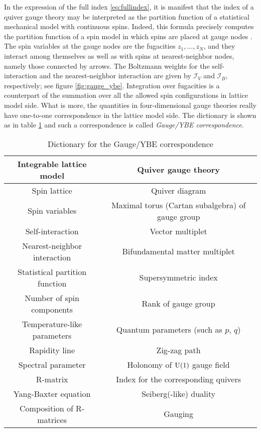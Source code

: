In the expression of the full index \eqref{eq:fullindex},
it is manifest that the index of a quiver gauge theory may be interpreted
as the partition function of a statistical mechanical model with continuous
spins. Indeed, this formula precisely computes the partition function
of a spin model in which spins are placed at gauge nodes \cite{Yamazaki:2012cp,Yagi:2015lha}.
The spin variables at the gauge nodes are the fugacities $z_{1},\ldots,z_{N}$, and
they interact among themselves as well as with spins at nearest-neighbor
nodes, namely those connected by arrows. The Boltzmann weights for
the self-interaction and the nearest-neighbor interaction are given by $\mathcal{I}_{V}$
and $\mathcal{I}_{B}$, respectively; see figure \ref{fig:gauge_ybe}.
Integration over fugacities is a counterpart of the summation over all the
allowed spin configurations in lattice model side.
What is more, the quantities in four-dimensional gauge theories really have one-to-one
correspondence in the lattice model side. The dictionary is shown as
in table \ref{tab:gauge_ybe} and such a correspondence is called \emph{Gauge/YBE correspondence}.


\begin{table}
\caption{Dictionary for the Gauge/YBE correspondence}
\vspace{0.2cm}
  \centering
    \begin{tabular}{c|c}
Integrable lattice model & Quiver gauge theory  \tabularnewline
\hline
\hline
Spin lattice            & Quiver diagram  \tabularnewline
Spin variables       & Maximal torus (Cartan subalgebra) of gauge group  \tabularnewline
Self-interaction    & Vector multiplet  \tabularnewline
Nearest-neighbor interaction & Bifundamental matter multiplet  \tabularnewline
Statistical partition function    & Supersymmetric index  \tabularnewline
Number of spin components  & Rank of gauge group  \tabularnewline
Temperature-like parameters & Quantum parameters (such as $p,\,q$)  \tabularnewline
Rapidity line          & Zig-zag path  \tabularnewline
Spectral parameter & Holonomy of $\mathrm{U}(1)$ gauge field  \tabularnewline  %
R-matrix                  &  Index for the corresponding quivers  \tabularnewline
Yang-Baxter equation  & Seiberg(-like) duality  \tabularnewline
Composition of R-matrices     &  Gauging  \tabularnewline
    \end{tabular}
\label{tab:gauge_ybe}
\end{table}







